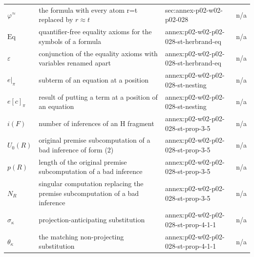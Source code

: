 \begin{longtable}{@{}p{}p{}p{}p{}@{}}
\(\varphi^{\approx}\) & the formula with every atom r=t replaced by \(r\approx t\) & sec:\allowbreak{}annex-\allowbreak{}p02-\allowbreak{}w02-\allowbreak{}p02-\allowbreak{}028 & n/a \\
\(\mathrm{Eq}\) & quantifier-free equality axioms for the symbols of a formula & annex:\allowbreak{}p02-\allowbreak{}w02-\allowbreak{}p02-\allowbreak{}028-\allowbreak{}st-\allowbreak{}herbrand-\allowbreak{}eq & n/a \\
\(\varepsilon\) & conjunction of the equality axioms with variables renamed apart & annex:\allowbreak{}p02-\allowbreak{}w02-\allowbreak{}p02-\allowbreak{}028-\allowbreak{}st-\allowbreak{}herbrand-\allowbreak{}eq & n/a \\
\(e|_\pi\) & subterm of an equation at a position & annex:\allowbreak{}p02-\allowbreak{}w02-\allowbreak{}p02-\allowbreak{}028-\allowbreak{}st-\allowbreak{}nesting & n/a \\
\(e[c]_\pi\) & result of putting a term at a position of an equation & annex:\allowbreak{}p02-\allowbreak{}w02-\allowbreak{}p02-\allowbreak{}028-\allowbreak{}st-\allowbreak{}nesting & n/a \\
\(i(F)\) & number of inferences of an H fragment & annex:\allowbreak{}p02-\allowbreak{}w02-\allowbreak{}p02-\allowbreak{}028-\allowbreak{}st-\allowbreak{}prop-\allowbreak{}3-\allowbreak{}5 & n/a \\
\(U_0(R)\) & original premise subcomputation of a bad inference of form (2) & annex:\allowbreak{}p02-\allowbreak{}w02-\allowbreak{}p02-\allowbreak{}028-\allowbreak{}st-\allowbreak{}prop-\allowbreak{}3-\allowbreak{}5 & n/a \\
\(p(R)\) & length of the original premise subcomputation of a bad inference & annex:\allowbreak{}p02-\allowbreak{}w02-\allowbreak{}p02-\allowbreak{}028-\allowbreak{}st-\allowbreak{}prop-\allowbreak{}3-\allowbreak{}5 & n/a \\
\(N_R\) & singular computation replacing the premise subcomputation of a bad inference & annex:\allowbreak{}p02-\allowbreak{}w02-\allowbreak{}p02-\allowbreak{}028-\allowbreak{}st-\allowbreak{}prop-\allowbreak{}3-\allowbreak{}5 & n/a \\
\(\sigma_\kappa\) & projection-anticipating substitution & annex:\allowbreak{}p02-\allowbreak{}w02-\allowbreak{}p02-\allowbreak{}028-\allowbreak{}st-\allowbreak{}prop-\allowbreak{}4-\allowbreak{}1-\allowbreak{}1 & n/a \\
\(\theta_\kappa\) & the matching non-projecting substitution & annex:\allowbreak{}p02-\allowbreak{}w02-\allowbreak{}p02-\allowbreak{}028-\allowbreak{}st-\allowbreak{}prop-\allowbreak{}4-\allowbreak{}1-\allowbreak{}1 & n/a \\

\end{longtable}
